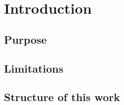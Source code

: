 \documentclass[ExampleMasters.tex]{subfiles}
\begin{document}
\clearpage	
\chapter{Introduction}


\section{Purpose}


\section{Limitations}
\section{Structure of this work}
\end{document}
